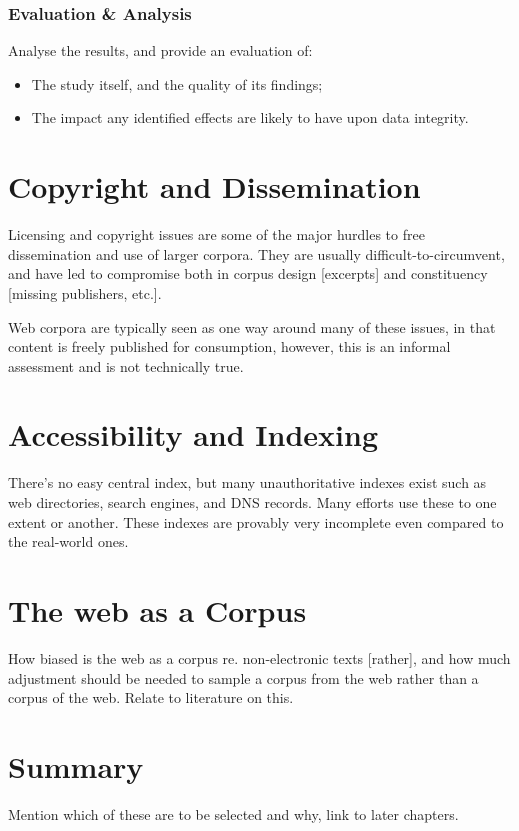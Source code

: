 \subsubsection{Evaluation \& Analysis}
Analyse the results, and provide an evaluation of:
\begin{itemize}
	\item The study itself, and the quality of its findings;
	\item The impact any identified effects are likely to have upon data integrity.
\end{itemize}






\section{Copyright and Dissemination}
Licensing and copyright issues are some of the major hurdles to free dissemination and use of larger corpora.  They are usually difficult-to-circumvent, and have led to compromise both in corpus design [excerpts] and constituency [missing publishers, etc.].

Web corpora are typically seen as one way around many of these issues, in that content is freely published for consumption, however, this is an informal assessment and is not technically true.  



\section{Accessibility and Indexing}
There's no easy central index, but many unauthoritative indexes exist such as web directories, search engines, and DNS records.  Many efforts use these to one extent or another.  These indexes are provably very incomplete even compared to the real-world ones.




\section{The web as a Corpus}
How biased is the web as a corpus re. non-electronic texts [rather], and how much adjustment should be needed to sample a corpus from the web rather than a corpus of the web.  Relate to literature on this.



\section{Summary}
Mention which of these are to be selected and why, link to later chapters.
